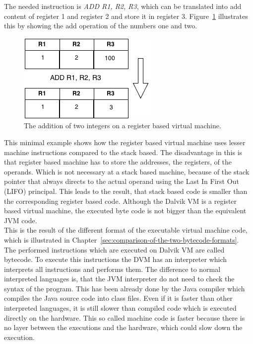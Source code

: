 The needed instruction is \textit{ADD R1, R2, R3}, which can be translated into add content of register 1 and register 2 and store it in register 3.
Figure~\ref{fig:register-based-addition} illustrates this by showing the add operation of the numbers one and two.
\begin{figure}[h]
\begin{center}
\includegraphics[scale=0.65]{images/register-based-addition.png} 
\caption{The addition of two integers on a register based virtual machine.}
\label{fig:register-based-addition}
\end{center}
\end{figure}
This minimal example shows how the register based virtual machine uses lesser machine instructions compared to the stack based.
The disadvantage in this is that register based machine has to store the addresses, the registers, of the operands.
Which is not necessary at a stack based machine, because of the stack pointer that always directs to the actual operand using the Last In First Out (LIFO) principal.
This leads to the result, that stack based code is smaller than the corresponding register based code.
Although the Dalvik VM is a register based virtual machine, the executed byte code is not bigger than the equivalent JVM code.~\cite{shi2008virtual}\\
This is the result of the different format of the executable virtual machine code, which is illustrated in Chapter~\ref{sec:comparison-of-the-two-bytecode-formats}.
\\
The performed instructions which are executed on Dalvik VM are called bytecode.
To execute this instructions the DVM has an interpreter which interprets all instructions and performs them.
The difference to normal interpreted languages is, that the JVM interpreter do not need to check the syntax of the program.
This has been already done by the Java compiler which compiles the Java source code into class files.
Even if it is faster than other interpreted languages, it is still slower than compiled code which is executed directly on the hardware.
This so called machine code is faster because there is no layer between the executions and the hardware, which could slow down the execution.~\cite{aycock2003brief}
